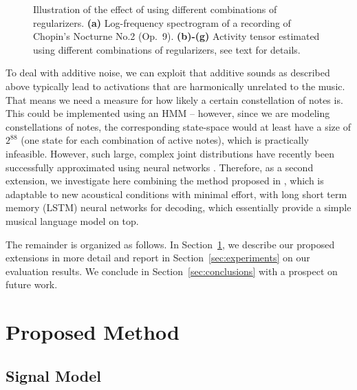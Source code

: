 \documentclass{article}
\begin{document}
\begin{figure}[t]
\vspace{-6mm}
\caption{Illustration of the effect of using different combinations of regularizers. \textbf{(a)} Log-frequency spectrogram of a recording of Chopin's Nocturne No.2 (Op.~9). \textbf{(b)-(g)} Activity tensor estimated using different combinations of regularizers, see text for details.}
\label{fig:IlluRegul}
\end{figure}

To deal with additive noise, we can exploit that additive sounds as described above typically lead to activations that are harmonically unrelated to the music. That means we need a measure for how likely a certain constellation of notes is. This could be implemented using an HMM -- however, since we are modeling constellations of notes, the corresponding state-space would at least have a size of $2^{88}$ (one state for each combination of active notes), which is practically infeasible. However, such large, complex joint distributions have recently been successfully approximated using neural networks \cite{BoulangerBV12_DeepRNN_ICML}\cite{SigtiaBD2016_NNPianoTrans_TASLP}. Therefore, as a second extension, we investigate here combining the method proposed in \cite{EwertS16_PianoTranscriptionADMM_TASLP}, which is adaptable to new acoustical conditions with minimal effort, with long short term memory (LSTM) neural networks for decoding, which essentially provide a simple musical language model on top. 

The remainder is organized as follows.
In Section~\ref{sec:proposedMethod}, we describe our proposed extensions in more detail and report in Section~\ref{sec:experiments} on our evaluation results. We conclude in Section~\ref{sec:conclusions} with a prospect on future work.

\section{Proposed Method}
\label{sec:proposedMethod}

\subsection{Signal Model}
\end{document}
